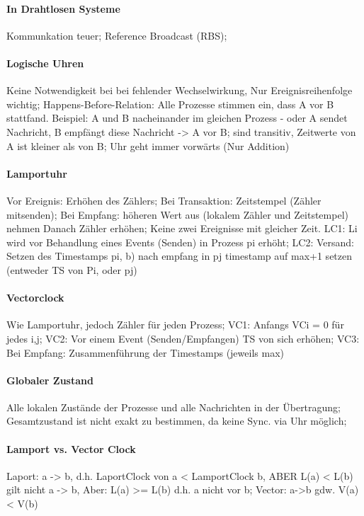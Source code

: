 \documentclass[pagesize,11pt,a4paper]{scrartcl}
\begin{document}
\paragraph*{In Drahtlosen Systeme}
	Kommunkation teuer; Reference Broadcast (RBS);

\paragraph*{Logische Uhren}
	Keine Notwendigkeit bei bei fehlender Wechselwirkung, Nur Ereignisreihenfolge wichtig;
	Happens-Before-Relation: Alle Prozesse stimmen ein, dass A vor B stattfand.
		Beispiel: A und B nacheinander im gleichen Prozess -
		oder A sendet Nachricht, B empfängt diese Nachricht -> A vor B;
	sind transitiv, Zeitwerte von A ist kleiner als von B;
	Uhr geht immer vorwärts (Nur Addition)

\paragraph*{Lamportuhr}
	Vor Ereignis: Erhöhen des Zählers;
	Bei Transaktion: Zeitstempel (Zähler mitsenden);
	Bei Empfang: höheren Wert aus (lokalem Zähler und Zeitstempel) nehmen Danach Zähler erhöhen;
	Keine zwei Ereignisse mit gleicher Zeit.
	LC1: Li wird vor Behandlung eines Events (Senden) in Prozess pi erhöht;
	LC2: Versand: Setzen des Timestamps pi, b) nach empfang in pj timestamp auf max+1 setzen (entweder TS von Pi, oder pj)

\paragraph*{Vectorclock}
	Wie Lamportuhr, jedoch Zähler für jeden Prozess;
	VC1: Anfangs VCi = 0 für jedes i,j;
	VC2: Vor einem Event (Senden/Empfangen) TS von sich erhöhen;
	VC3: Bei Empfang: Zusammenführung der Timestamps (jeweils max)

\paragraph*{Globaler Zustand}
	Alle lokalen Zustände der Prozesse und alle Nachrichten in der Übertragung;
	Gesamtzustand ist nicht exakt zu bestimmen, da keine Sync. via Uhr möglich;

\paragraph*{Lamport vs. Vector Clock}
	Laport: a -> b, d.h. LaportClock von a < LamportClock b, ABER L(a) < L(b) gilt nicht a -> b, Aber: L(a) >= L(b) d.h. a nicht vor b;
	Vector: a->b gdw. V(a) < V(b)
\end{document}
